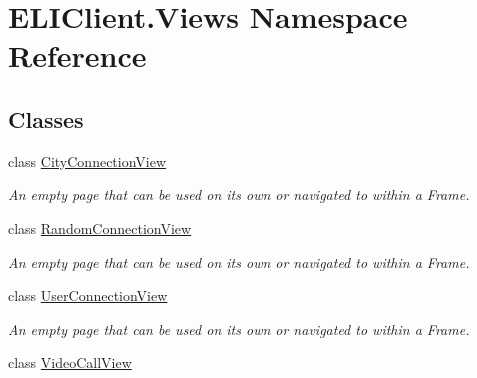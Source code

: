 \hypertarget{namespace_e_l_i_client_1_1_views}{}\section{E\+L\+I\+Client.\+Views Namespace Reference}
\label{namespace_e_l_i_client_1_1_views}
\subsection*{Classes}
\begin{DoxyCompactItemize}
\item 
class \hyperlink{class_e_l_i_client_1_1_views_1_1_city_connection_view}{City\+Connection\+View}
\begin{DoxyCompactList}\small\item\em An empty page that can be used on its own or navigated to within a Frame. \end{DoxyCompactList}\item 
class \hyperlink{class_e_l_i_client_1_1_views_1_1_random_connection_view}{Random\+Connection\+View}
\begin{DoxyCompactList}\small\item\em An empty page that can be used on its own or navigated to within a Frame. \end{DoxyCompactList}\item 
class \hyperlink{class_e_l_i_client_1_1_views_1_1_user_connection_view}{User\+Connection\+View}
\begin{DoxyCompactList}\small\item\em An empty page that can be used on its own or navigated to within a Frame. \end{DoxyCompactList}\item 
class \hyperlink{class_e_l_i_client_1_1_views_1_1_video_call_view}{Video\+Call\+View}
\end{DoxyCompactItemize}
